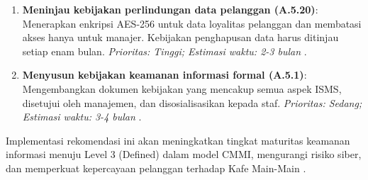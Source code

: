 \documentclass[12pt, a4paper]{report}
\begin{document}
\begin{enumerate}
    \item \textbf{Meninjau kebijakan perlindungan data pelanggan (A.5.20)}: Menerapkan enkripsi AES-256 untuk data loyalitas pelanggan dan membatasi akses hanya untuk manajer. Kebijakan penghapusan data harus ditinjau setiap enam bulan. \textit{Prioritas: Tinggi; Estimasi waktu: 2-3 bulan} \citep{ratnasari2021pelindungan}.
    \item \textbf{Menyusun kebijakan keamanan informasi formal (A.5.1)}: Mengembangkan dokumen kebijakan yang mencakup semua aspek ISMS, disetujui oleh manajemen, dan disosialisasikan kepada staf. \textit{Prioritas: Sedang; Estimasi waktu: 3-4 bulan} \citep{rokhman2018implementasi}.
\end{enumerate}
Implementasi rekomendasi ini akan meningkatkan tingkat maturitas keamanan informasi menuju Level 3 (Defined) dalam model CMMI, mengurangi risiko siber, dan memperkuat kepercayaan pelanggan terhadap Kafe Main-Main \citep{cmmi, nijamaliza2018adaptable}.

\renewcommand{\bibname}{Pustaka}
% 



% 
\end{document}
